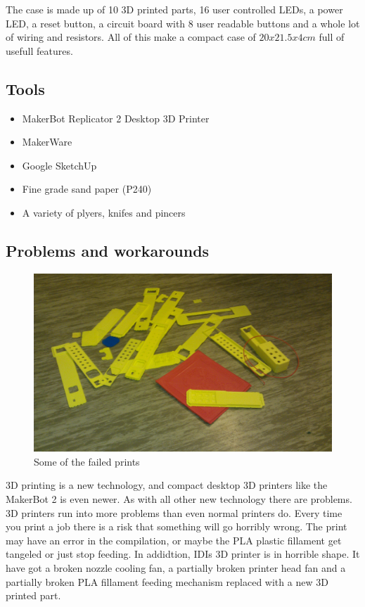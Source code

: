 The case is made up of 10 3D printed parts, 16 user controlled LEDs, a power LED, a reset button, a circuit board with 8 user readable buttons and a whole lot of wiring and resistors.
All of this make a compact case of $20 x 21.5 x 4 cm$ full of usefull features.

\subsection{Tools}

\begin{itemize}
    \item MakerBot Replicator 2 Desktop 3D Printer
    \item MakerWare
    \item Google SketchUp
    \item Fine grade sand paper (P240)
    \item A variety of plyers, knifes and pincers
\end{itemize}

\subsection{Problems and workarounds}

\begin{figure}[H]
\includegraphics[width=\textwidth,keepaspectratio,clip]{additional-components/some-failed-prints.jpg}%
\caption{Some of the failed prints}
\end{figure}

3D printing is a new technology, and compact desktop 3D printers like the MakerBot 2 is even newer.
As with all other new technology there are problems.
3D printers run into more problems than even normal printers do.
Every time you print a job there is a risk that something will go horribly wrong.
The print may have an error in the compilation, or maybe the PLA plastic fillament get tangeled or just stop feeding.
In addidtion, IDIs 3D printer is in horrible shape.
It have got a broken nozzle cooling fan, a partially broken printer head fan and a partially broken PLA fillament feeding mechanism replaced with a new 3D printed part.

